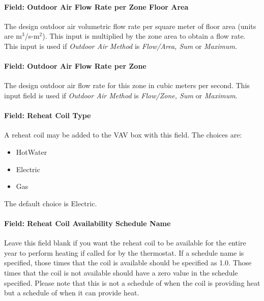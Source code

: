 \paragraph{Field: Outdoor Air Flow Rate per Zone Floor Area}\label{field-outdoor-air-flow-rate-per-zone-floor-area-9}

The design outdoor air volumetric flow rate per square meter of floor area (units are m\(^{3}\)/s-m\(^{2}\)). This input is multiplied by the zone area to obtain a flow rate. This input is used if \emph{Outdoor Air Method} is \emph{Flow/Area, Sum} or \emph{Maximum}.

\paragraph{Field: Outdoor Air Flow Rate per Zone}\label{field-outdoor-air-flow-rate-per-zone-9}

The design outdoor air flow rate for this zone in cubic meters per second. This input field is used if \emph{Outdoor Air Method} is \emph{Flow/Zone, Sum} or \emph{Maximum}.

\paragraph{Field: Reheat Coil Type}\label{field-reheat-coil-type-1}

A reheat coil may be added to the VAV box with this field. The choices are:

\begin{itemize}
\item
  HotWater
\item
  Electric
\item
  Gas
\end{itemize}

The default choice is Electric.

\paragraph{Field: Reheat Coil Availability Schedule Name}\label{field-reheat-coil-availability-schedule-name-1}

Leave this field blank if you want the reheat coil to be available for the entire year to perform heating if called for by the thermostat. If a schedule name is specified, those times that the coil is available should be specified as 1.0. Those times that the coil is not available should have a zero value in the schedule specified. Please note that this is not a schedule of when the coil is providing heat but a schedule of when it can provide heat.

